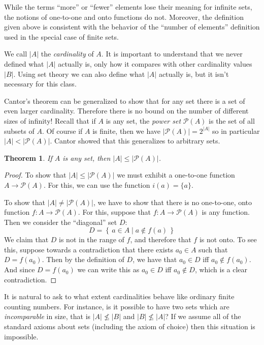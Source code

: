 \documentclass[11pt,oneside]{amsbook}
\newcommand{\set}[1]{\left\{\,#1\,\right\}}
\theoremstyle{definition}
\theoremstyle{plain}
\newtheorem{thm}{Theorem}[section]
\theoremstyle{definition}
\theoremstyle{remark}
\numberwithin{equation}{section}
\numberwithin{figure}{section}
\begin{document}
While the terms ``more'' or ``fewer'' elements lose their meaning for infinite sets, the notions of one-to-one and onto functions do not. Moreover, the definition given above is consistent with the behavior of the ``number of elements'' definition used in the special case of finite sets.

We call $|A|$ the \emph{cardinality} of $A$. It is important to understand that we never defined what $|A|$ actually is, only how it compares with other cardinality values $|B|$. Using set theory we can also define what $|A|$ actually is, but it isn't necessary for this class.

Cantor's theorem can be generalized to show that for any set there is a set of even larger cardinality. Therefore there is no bound on the number of different sizes of infinity! Recall that if $A$ is any set, the \emph{power set} $\mathcal P(A)$ is the set of all subsets of $A$. Of course if $A$ is finite, then we have $|\mathcal P(A)|=2^{|A|}$ so in particular $|A|<|\mathcal P(A)|$. Cantor showed that this generalizes to arbitrary sets.

\begin{thm}
  If $A$ is any set, then $|A|\leq|\mathcal P(A)|$.
\end{thm}

\begin{proof}
  To show that $|A|\leq|\mathcal P(A)|$ we must exhibit a one-to-one function $A\to\mathcal P(A)$. For this, we can use the function $i(a)=\{a\}$.

  To show that $|A|\neq|\mathcal P(A)|$, we have to show that there is no one-to-one, onto function $f\colon A\to\mathcal P(A)$. For this, suppose that $f\colon A\to\mathcal P(A)$ is any function. Then we consider the ``diagonal'' set $D$:
  \[D=\set{a\in A\mid a\notin f(a)}
  \]
  We claim that $D$ is not in the range of $f$, and therefore that $f$ is not onto. To see this, suppose towards a contradiction that there exists $a_0\in A$ such that $D=f(a_0)$. Then by the definition of $D$, we have that $a_0\in D$ iff $a_0\notin f(a_0)$. And since $D=f(a_0)$ we can write this as $a_0\in D$ iff $a_0\notin D$, which is a clear contradiction.
\end{proof}

It is natural to ask to what extent cardinalities behave like ordinary finite counting numbers. For instance, is it possible to have two sets which are \emph{incomparable} in size, that is $|A|\not\leq|B|$ and $|B|\not\leq|A|$? If we assume all of the standard axioms about sets (including the axiom of choice) then this situation is impossible.
\end{document}
